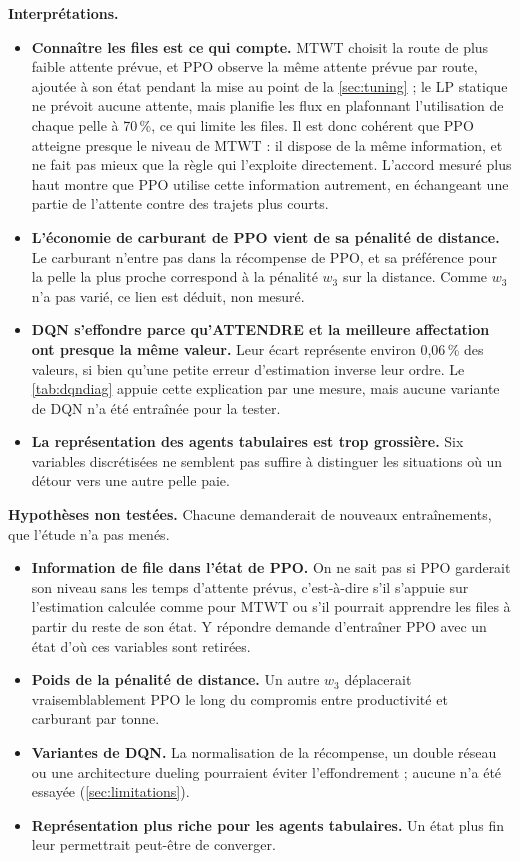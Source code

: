 \documentclass[11pt,a4paper]{article}
\newif\ifcorrmarks
\newenvironment{corrbloc}{\par\ifcorrmarks\color{corrcolor}\fi}{\par}
\begin{document}
\begin{corrbloc}
\textbf{Interprétations.}
\begin{itemize}
  \item \textbf{Connaître les files est ce qui compte.} MTWT choisit la route de plus faible attente prévue, et PPO observe la même attente prévue par route, ajoutée à son état pendant la mise au point de la \cref{sec:tuning} ; le LP statique ne prévoit aucune attente, mais planifie les flux en plafonnant l'utilisation de chaque pelle à 70\,\%, ce qui limite les files. Il est donc cohérent que PPO atteigne presque le niveau de MTWT : il dispose de la même information, et ne fait pas mieux que la règle qui l'exploite directement. L'accord mesuré plus haut montre que PPO utilise cette information autrement, en échangeant une partie de l'attente contre des trajets plus courts.
  \item \textbf{L'économie de carburant de PPO vient de sa pénalité de distance.} Le carburant n'entre pas dans la récompense de PPO, et sa préférence pour la pelle la plus proche correspond à la pénalité $w_3$ sur la distance. Comme $w_3$ n'a pas varié, ce lien est déduit, non mesuré.
  \item \textbf{DQN s'effondre parce qu'ATTENDRE et la meilleure affectation ont presque la même valeur.} Leur écart représente environ 0,06\,\% des valeurs, si bien qu'une petite erreur d'estimation inverse leur ordre. Le \cref{tab:dqndiag} appuie cette explication par une mesure, mais aucune variante de DQN n'a été entraînée pour la tester.
  \item \textbf{La représentation des agents tabulaires est trop grossière.} Six variables discrétisées ne semblent pas suffire à distinguer les situations où un détour vers une autre pelle paie.
\end{itemize}

\textbf{Hypothèses non testées.} Chacune demanderait de nouveaux entraînements, que l'étude n'a pas menés.
\begin{itemize}
  \item \textbf{Information de file dans l'état de PPO.} On ne sait pas si PPO garderait son niveau sans les temps d'attente prévus, c'est-à-dire s'il s'appuie sur l'estimation calculée comme pour MTWT ou s'il pourrait apprendre les files à partir du reste de son état. Y répondre demande d'entraîner PPO avec un état d'où ces variables sont retirées.
  \item \textbf{Poids de la pénalité de distance.} Un autre $w_3$ déplacerait vraisemblablement PPO le long du compromis entre productivité et carburant par tonne.
  \item \textbf{Variantes de DQN.} La normalisation de la récompense, un double réseau ou une architecture dueling pourraient éviter l'effondrement ; aucune n'a été essayée (\cref{sec:limitations}).
  \item \textbf{Représentation plus riche pour les agents tabulaires.} Un état plus fin leur permettrait peut-être de converger.
\end{itemize}
\end{corrbloc}
\end{document}
